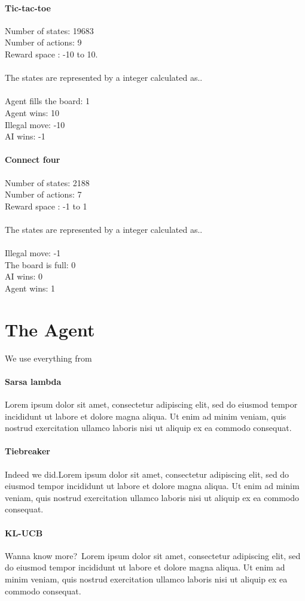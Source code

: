 \documentclass[letterpaper,twocolumn,10pt]{article}
\begin{document}
\paragraph{Tic-tac-toe}
Number of states: 19683 \\
Number of actions: 9\\
Reward space : -10 to 10.\\
\\
The states are represented by a integer calculated as..\\
\\
Agent fills the board: 1\\
Agent wins: 10\\
Illegal move: -10\\
AI wins: -1
\paragraph{Connect four}
Number of states: 2188 \\
Number of actions: 7\\
Reward space : -1 to 1\\
\\
The states are represented by a integer calculated as..\\
\\
Illegal move: -1\\
The board is full:  0\\
AI wins: 0\\
Agent wins: 1
\section{The Agent}
We use everything from~\cite{Sutton:1998:IRL:551283}
\paragraph{Sarsa lambda}
Lorem ipsum dolor sit amet, consectetur adipiscing elit, sed do eiusmod tempor incididunt ut labore et dolore magna aliqua. Ut enim ad minim veniam, quis nostrud exercitation ullamco laboris nisi ut aliquip ex ea commodo consequat. 
\paragraph{Tiebreaker}Indeed we did.Lorem ipsum dolor sit amet, consectetur adipiscing elit, sed do eiusmod tempor incididunt ut labore et dolore magna aliqua. Ut enim ad minim veniam, quis nostrud exercitation ullamco laboris nisi ut aliquip ex ea commodo consequat. 
\paragraph{KL-UCB}Wanna know more?~\cite{DBLP:journals/jmlr/GarivierC11}Lorem ipsum dolor sit amet, consectetur adipiscing elit, sed do eiusmod tempor incididunt ut labore et dolore magna aliqua. Ut enim ad minim veniam, quis nostrud exercitation ullamco laboris nisi ut aliquip ex ea commodo consequat. 
\end{document}
